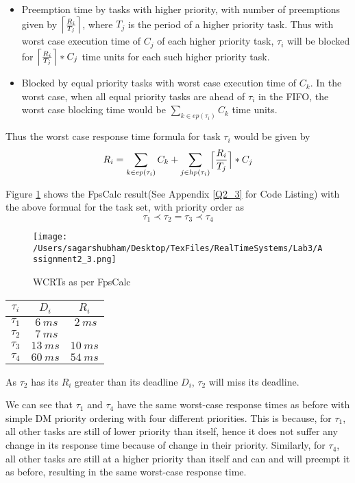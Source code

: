 \documentclass[oneside,a4paper]{article}
\DeclarePairedDelimiter{\ceil}{\lceil}{\rceil}
\begin{document}
\begin{itemize}
    \item Preemption time by tasks with higher priority, with number of preemptions given by $\ceil[\Big]{\frac{R_i}{T_j}}$, where $T_j$ is the period of a higher priority task. Thus with worst case execution time of $C_j$ of each higher priority task, $\tau_i$ will be blocked for $\ceil[\Big]{\frac{R_i}{T_j}} * C_j$ time units for each such higher priority task. \\
    \item Blocked by equal priority tasks with worst case execution time of $C_k$. In the worst case, when all equal priority tasks are ahead of $\tau_i$ in the FIFO, the worst case blocking time would be $\sum_{k \in ep(\tau_i)}C_k$ time units.
\end{itemize}
Thus the worst case response time formula for task $\tau_i$ would be given by 
$$R_i = \sum_{k \in ep(\tau_i)}C_k + \sum_{j \in hp(\tau_i)}\ceil[\Big]{\frac{R_i}{T_j}}*C_j$$\par
Figure \ref{fig2_3} shows the FpsCalc result(See Appendix \ref{Q2_3} for Code Listing) with the above formual for the task set, with priority order as
$$\tau_1 \prec \tau_2 = \tau_3 \prec \tau_4  $$
\begin{center}
\begin{figure}[H]
                    \centering
                    \texttt{[image: /Users/sagarshubham/Desktop/TexFiles/RealTimeSystems/Lab3/Assignment2\_3.png]}
                    \caption[Figure for Question 2.3]{WCRTs as per FpsCalc}
                    \label{fig2_3}        
\end{figure}
\begin{tabular}{| c | c | c |}
\hline
\textbf{$\tau_i$} & \textbf{$D_i$} & \textbf{$R_i$} \\
\hline
$\tau_1$ & $\ 6\ ms$ & $\ 2\ ms$ \\
$\tau_2$ & $\ 7\ ms$ & \color{red}{$10\ ms$} \\
$\tau_3$ & $13\ ms$ & $10\ ms$ \\
$\tau_4$ & $60\ ms$ & $54\ ms$ \\
\hline
\end{tabular}
\end{center}\par
As $\tau_2$ has its $R_i$ greater than its deadline $D_i$, $\tau_2$ will miss its deadline. \par

We can see that $\tau_1$ and $\tau_4$ have the same worst-case response times as before with simple DM priority ordering with four different priorities. This is because, for $\tau_1$, all other tasks are still of lower priority than itself, hence it does not suffer any change in its response time because of change in their priority. Similarly, for $\tau_4$, all other tasks are still at a higher priority than itself and can and will preempt it as before, resulting in the same worst-case response time.
\pagebreak
\end{document}
